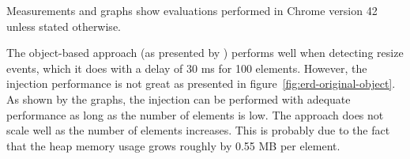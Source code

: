 \documentclass{acm_proc_article-sp}
\begin{document}
    Measurements and graphs show evaluations performed in Chrome version 42 unless stated otherwise.


    

    The object-based approach (as presented by \cite{backalley}) performs well when detecting resize events, which it does with a delay of 30 ms for 100 elements.
    However, the injection performance is not great as presented in figure~\ref{fig:erd-original-object}.
    As shown by the graphs, the injection can be performed with adequate performance as long as the number of elements is low.
    The approach does not scale well as the number of elements increases.
    This is probably due to the fact that the heap memory usage grows roughly by 0.55 MB per element.
\end{document}
